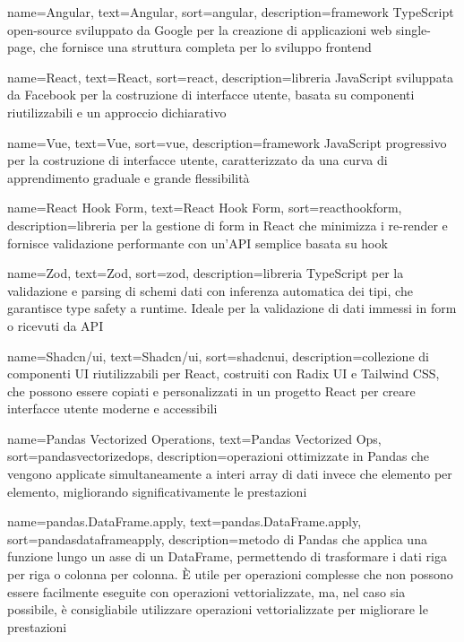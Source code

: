  {
    name=Angular,
    text=Angular,
    sort=angular,
    description={framework TypeScript open-source sviluppato da Google per la creazione di applicazioni web single-page, che fornisce una struttura completa per lo sviluppo frontend}
}

 {
    name=React,
    text=React,
    sort=react,
    description={libreria JavaScript sviluppata da Facebook per la costruzione di interfacce utente, basata su componenti riutilizzabili e un approccio dichiarativo}
}

 {
    name=Vue,
    text=Vue,
    sort=vue,
    description={framework JavaScript progressivo per la costruzione di interfacce utente, caratterizzato da una curva di apprendimento graduale e grande flessibilità}
}

 {
    name=React Hook Form,
    text=React Hook Form,
    sort=reacthookform,
    description={libreria per la gestione di form in React che minimizza i re-render e fornisce validazione performante con un'API semplice basata su hook}
}

 {
    name=Zod,
    text=Zod,
    sort=zod,
    description={libreria TypeScript per la validazione e parsing di schemi dati con inferenza automatica dei tipi, che garantisce type safety a runtime. Ideale per la validazione di dati immessi in form o ricevuti da API}
}

 {
    name=Shadcn/ui,
    text=Shadcn/ui,
    sort=shadcnui,
    description={collezione di componenti UI riutilizzabili per React, costruiti con Radix UI e Tailwind CSS, che possono essere copiati e personalizzati in un progetto React per creare interfacce utente moderne e accessibili}
}

 {
    name=Pandas Vectorized Operations,
    text=Pandas Vectorized Ops,
    sort=pandasvectorizedops,
    description={operazioni ottimizzate in Pandas che vengono applicate simultaneamente a interi array di dati invece che elemento per elemento, migliorando significativamente le prestazioni}
}

 {
    name=pandas.DataFrame.apply,
    text=pandas.DataFrame.apply,
    sort=pandasdataframeapply,
    description={metodo di Pandas che applica una funzione lungo un asse di un DataFrame, permettendo di trasformare i dati riga per riga o colonna per colonna. È utile per operazioni complesse che non possono essere facilmente eseguite con operazioni vettorializzate, ma, nel caso sia possibile, è consigliabile utilizzare operazioni vettorializzate per migliorare le prestazioni}
}

